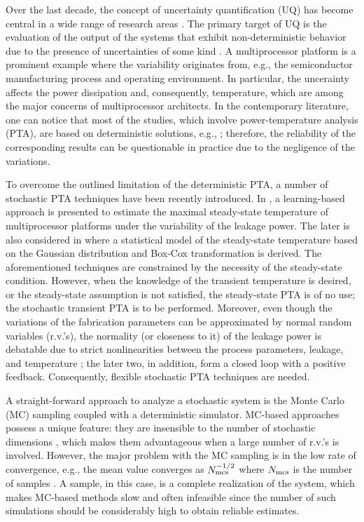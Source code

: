 Over the last decade, the concept of uncertainty quantification (UQ) has become central in a wide range of research areas \cite{xiu2009}. The primary target of UQ is the evaluation of the output of the systems that exhibit non-deterministic behavior due to the presence of uncertainties of some kind \cite{eldred2009}. A multiprocessor platform is a prominent example where the variability originates from, e.g., the semiconductor manufacturing process and operating environment. In particular, the uncerainty affects the power dissipation and, consequently, temperature, which are among the major concerns of multiprocessor architects. In the contemporary literature, one can notice that most of the studies, which involve power-temperature analysis (PTA), are based on deterministic solutions, e.g., \cite{ukhov2012}; therefore, the reliability of the corresponding results can be questionable in practice due to the negligence of the variations.

To overcome the outlined limitation of the deterministic PTA, a number of stochastic PTA techniques have been recently introduced. In \cite{juan2011}, a learning-based approach is presented to estimate the maximal steady-state temperature of multiprocessor platforms under the variability of the leakage power. The later is also considered in \cite{juan2012} where a statistical model of the steady-state temperature based on the Gaussian distribution and Box-Cox transformation \cite{box1964} is derived. The aforementioned techniques are constrained by the necessity of the steady-state condition. However, when the knowledge of the transient temperature is desired, or the steady-state assumption is not satisfied, the steady-state PTA is of no use; the stochastic transient PTA is to be performed. Moreover, even though the variations of the fabrication parameters can be approximated by normal random variables (r.v.'s), the normality (or closeness to it) of the leakage power is debatable due to strict nonlinearities between the process parameters, leakage, and temperature \cite{liu2007}; the later two, in addition, form a closed loop with a positive feedback. Consequently, flexible stochastic PTA techniques are needed.

A straight-forward approach to analyze a stochastic system is the Monte Carlo (MC) sampling coupled with a deterministic simulator. MC-based approaches possess a unique feature: they are insensible to the number of stochastic dimensions \cite{maitre2010}, which makes them advantageous when a large number of r.v.'s is involved. However, the major problem with the MC sampling is in the low rate of convergence, e.g., the mean value converges as $N_\text{mcs}^{-{{1}/{2}}}$ where $N_\text{mcs}$ is the number of samples \cite{xiu2009, maitre2010}. A sample, in this case, is a complete realization of the system, which makes MC-based methods slow and often infeasible since the number of such simulations should be considerably high to obtain reliable estimates.

